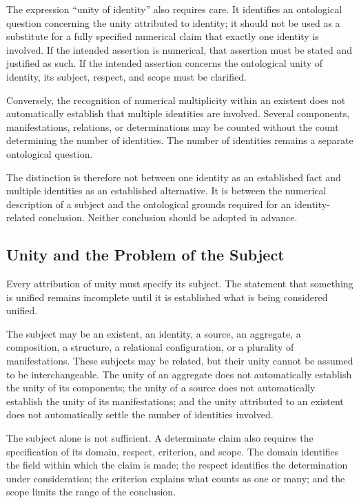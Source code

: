 The expression ``unity of identity'' also
requires care. It identifies an ontological
question concerning the unity attributed
to identity; it should not be used as a
substitute for a fully specified numerical
claim that exactly one identity is involved.
If the intended assertion is numerical,
that assertion must be stated and justified
as such. If the intended assertion concerns
the ontological unity of identity, its
subject, respect, and scope must be clarified.

Conversely, the recognition of numerical
multiplicity within an existent does not
automatically establish that multiple
identities are involved. Several components,
manifestations, relations, or determinations
may be counted without the count determining
the number of identities. The number of
identities remains a separate ontological
question.

The distinction is therefore not between
one identity as an established fact and
multiple identities as an established
alternative. It is between the numerical
description of a subject and the ontological
grounds required for an identity-related
conclusion. Neither conclusion should be
adopted in advance.

\subsection{Unity and the Problem of the Subject}

Every attribution of unity must specify
its subject. The statement that something
is unified remains incomplete until it
is established what is being considered
unified.

The subject may be an existent, an identity,
a source, an aggregate, a composition,
a structure, a relational configuration,
or a plurality of manifestations. These
subjects may be related, but their unity
cannot be assumed to be interchangeable.
The unity of an aggregate does not
automatically establish the unity of its
components; the unity of a source does
not automatically establish the unity
of its manifestations; and the unity
attributed to an existent does not
automatically settle the number of
identities involved.

The subject alone is not sufficient.
A determinate claim also requires the
specification of its domain, respect,
criterion, and scope. The domain identifies
the field within which the claim is made;
the respect identifies the determination
under consideration; the criterion explains
what counts as one or many; and the scope
limits the range of the conclusion.

